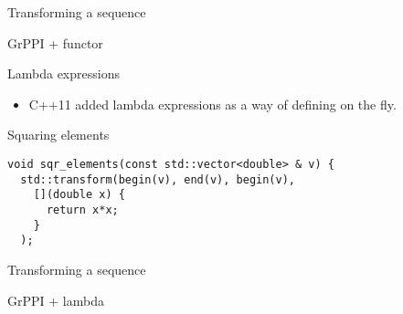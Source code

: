 \begin{frame}[t,fragile]{Transforming a sequence}
\begin{block}{GrPPI + functor}

\end{block}
\end{frame}

\begin{frame}[t,fragile]{Lambda expressions}
\begin{itemize}
  \item C++11 added lambda expressions as a way of defining on the fly.
\end{itemize}
\begin{block}{Squaring elements}
\begin{lstlisting}
void sqr_elements(const std::vector<double> & v) {
  std::transform(begin(v), end(v), begin(v),
    [](double x) { 
      return x*x; 
    }
  );
\end{lstlisting}
\end{block}
\end{frame}

\begin{frame}[t,fragile]{Transforming a sequence}
\begin{block}{GrPPI + lambda}

\end{block}
\end{frame}

